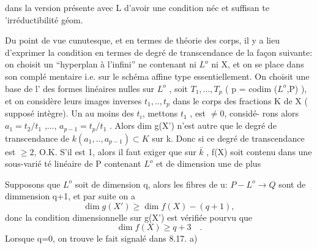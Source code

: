 
dans la version présente  avec L d'avoir une condition néc et suffisan%
te 'irréductibilité géom. 

Du point de vue cunutesque,  et en termes de théorie des
corps, il y a lieu d'exprimer la condition  en termes de
degré de transcendance de la façon suivante: on choisit un ``hyperplan
à l'infini'' ne contenant ni $L^{o}$ ni X, et on se place dans son complé%
mentaire i.e. sur le schéma affine  type essentiellement. On choisit
une base de l' des formes linéaires nulles sur $L^{o}$ , 
 soit $T_{1},\ldots,T_{p}$ ( p = codim ($L^{o}$,P) ), et on considère
leurs images inverses $t_{1},..,t_{p}$ dans le corps des fractions K de X
( supposé intègre). Un au moins des $t_{i}$, mettons $t_{1}$ , est $\neq 0$, considé-%
rons alors $a_{1} = t_{2}/t_{1}$ ,..., $a_{p-1} = t_{p}/t_{1}$ . Alors dim g(X') n'est
autre que le degré de transcendance de $k(a_{1},..,a_{p-1}) \subset K$ sur k. Donc
si ce degré de transcendance est $\geqslant 2$, O.K.  S'il est 1,
alors il faut exiger que sur $\bar{k}$ , f(X) soit contenu dans une sous-varié%
té linéaire de P contenant $L^{o}$ et de dimension une de plus

Supposons que $L^{o}$ soit de dimension q, alors les fibres de u:
$P - L^{o} \to Q$ sont de dimmension q+1,  et par suite on a
\[ \dim g(X') \geqslant \dim f(X) - (q+1) , \]
donc la condition dimensionnelle sur g(X') est vérifiée pourvu que
\[ \dim f(X) \geqslant q+3 \quad . \]
Lorsque q=0, on trouve le fait signalé dans 8.17. a)\unsure{,}  

